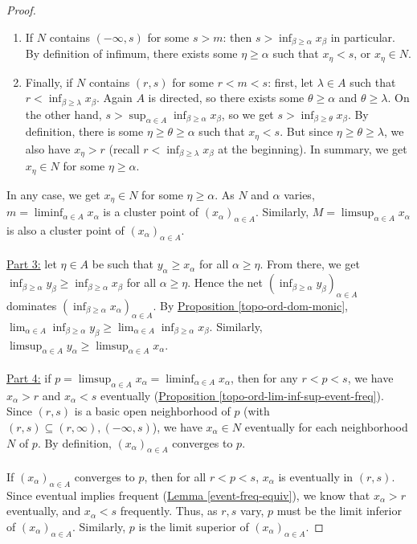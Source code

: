 \documentclass{treatise}
\begin{document}
\begin{proof}
\begin{enumerate}
    \item If $N$ contains $(-\infty, s)$ for some $s > m$: then $s > \inf_{\beta \geq \alpha} x_\beta$ in particular. By definition of infimum, there exists some $\eta \geq \alpha$ such that $x_\eta < s$, or $x_\eta \in N$.
    \item Finally, if $N$ contains $(r, s)$ for some $r < m < s$: first, let $\lambda \in A$ such that $r < \inf_{\beta \geq \lambda} x_\beta$. Again $A$ is directed, so there exists some $\theta \geq \alpha$ and $\theta \geq \lambda$. On the other hand, $s > \sup_{\alpha \in A} \inf_{\beta \geq \alpha} x_\beta$, so we get $s > \inf_{\beta \geq \theta} x_\beta$. By definition, there is some $\eta \geq \theta \geq \alpha$ such that $x_\eta < s$. But since $\eta \geq \theta \geq \lambda$, we also have $x_\eta > r$ (recall $r < \inf_{\beta \geq \lambda} x_\beta$ at the beginning). In summary, we get $x_\eta \in N$ for some $\eta \geq \alpha$.
\end{enumerate}
In any case, we get $x_\eta \in N$ for some $\eta \geq \alpha$. As $N$ and $\alpha$ varies, $m = \liminf_{\alpha \in A} x_\alpha$ is a cluster point of $(x_\alpha)_{\alpha \in A}$. Similarly, $M = \limsup_{\alpha \in A} x_\alpha$ is also a cluster point of $(x_\alpha)_{\alpha \in A}$.
\\
\\
\underline{Part 3:} let $\eta \in A$ be such that $y_\alpha \geq x_\alpha$ for all $\alpha \geq \eta$. From there, we get $\inf_{\beta \geq \alpha} y_\beta \geq \inf_{\beta \geq \alpha} x_\beta$ for all $\alpha \geq \eta$. Hence the net $(\inf_{\beta \geq \alpha} y_\beta)_{\alpha \in A}$ dominates $(\inf_{\beta \geq \alpha} x_\alpha)_{\alpha \in A}$. By \hyperref[topo-ord-dom-monic]{Proposition \ref*{topo-ord-dom-monic}}, $\lim_{\alpha \in A} \inf_{\beta \geq \alpha} y_\beta \geq \lim_{\alpha \in A} \inf_{\beta \geq \alpha} x_\beta$. Similarly, $\limsup_{\alpha \in A} y_\alpha \geq \limsup_{\alpha \in A} x_\alpha$.
\\
\\
\underline{Part 4:} if $p = \limsup_{\alpha \in A} x_\alpha = \liminf_{\alpha \in A} x_\alpha$, then for any $r < p < s$, we have $x_\alpha > r$ and $x_\alpha < s$ eventually (\hyperref[topo-ord-lim-inf-sup-event-freq]{Proposition \ref*{topo-ord-lim-inf-sup-event-freq}}). Since $(r, s)$ is a basic open neighborhood of $p$ (with $(r, s) \subseteq (r, \infty), (-\infty, s)$), we have $x_\alpha \in N$ eventually for each neighborhood $N$ of $p$. By definition, $(x_\alpha)_{\alpha \in A}$ converges to $p$.
\\
\\
If $(x_\alpha)_{\alpha \in A}$ converges to $p$, then for all $r < p < s$, $x_\alpha$ is eventually in $(r, s)$. Since eventual implies frequent (\hyperref[event-freq-equiv]{Lemma \ref*{event-freq-equiv}}), we know that $x_\alpha > r$ eventually, and $x_\alpha < s$ frequently. Thus, as $r, s$ vary, $p$ must be the limit inferior of $(x_\alpha)_{\alpha \in A}$. Similarly, $p$ is the limit superior of $(x_\alpha)_{\alpha \in A}$.
\end{proof}
\end{document}
